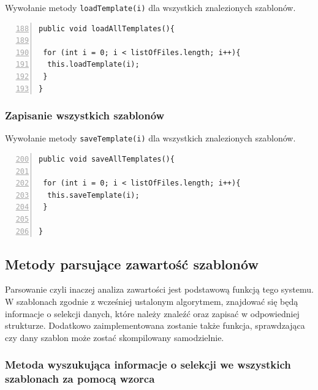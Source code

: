 Wywołanie metody \texttt{loadTemplate(i)} dla wszystkich znalezionych szablonów.

 \begin{lstlisting}[numbers=left,firstnumber=188]
public void loadAllTemplates(){
      
 for (int i = 0; i < listOfFiles.length; i++){
  this.loadTemplate(i);
 }
}
\end{lstlisting}

\subsubsection*{Zapisanie wszystkich szablonów}

Wywołanie metody \texttt{saveTemplate(i)} dla wszystkich znalezionych szablonów.

 \begin{lstlisting}[numbers=left,firstnumber=200]
public void saveAllTemplates(){
      
 for (int i = 0; i < listOfFiles.length; i++){
  this.saveTemplate(i);
 }
       
}
\end{lstlisting}

\subsection{Metody parsujące zawartość szablonów}

Parsowanie czyli inaczej analiza zawartości jest podstawową funkcją tego systemu. W szablonach zgodnie z wcześniej ustalonym algorytmem, znajdować się będą informacje o selekcji danych, które należy znaleźć oraz zapisać w odpowiedniej strukturze. Dodatkowo zaimplementowana zostanie także funkcja, sprawdzająca czy dany szablon może zostać skompilowany samodzielnie. 

\subsubsection*{Metoda wyszukująca informacje o selekcji we wszystkich szablonach za pomocą wzorca}

